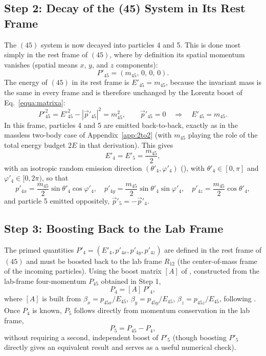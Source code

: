 \documentclass{article}
\begin{document}
\subsection{Step 2: Decay of the (45) System in Its Rest Frame}
The $(45)$ system is now decayed into particles 4 and 5. This is done most simply in the rest frame of $(45)$, where by definition its spatial momentum vanishes (spatial means $x$, $y$, and $z$ components):
\begin{equation}
    P'_{45} = (m_{45},\, 0,\, 0,\, 0).
\end{equation}
The energy of $(45)$ in its rest frame is $E'_{45}=m_{45}$, because the invariant mass is the same in every frame and is therefore unchanged by the Lorentz boost of Eq.~\ref{equa:matrixa}:
\begin{equation}
    P'^2_{45} = E'^2_{45} - |\vec{p}'_{45}|^2 = m_{45}^2, \qquad \vec{p}'_{45} = 0 \quad \Rightarrow \quad E'_{45} = m_{45}.
\end{equation}
In this frame, particles 4 and 5 are emitted back-to-back, exactly as in the massless two-body case of Appendix~\ref{app:2to2} (with $m_{45}$ playing the role of the total energy budget $2E$ in that derivation). This gives
\begin{equation}
    E'_4 = E'_5 = \frac{m_{45}}{2},
\end{equation}
with an isotropic random emission direction $(\theta'_4, \varphi'_4)$ (), with $\theta'_4 \in [0,\pi]$ and $\varphi'_4 \in [0, 2\pi)$, so that
\begin{equation}
    p'_{4x} = \frac{m_{45}}{2}\sin\theta'_4\cos\varphi'_4, \quad p'_{4y} = \frac{m_{45}}{2}\sin\theta'_4\sin\varphi'_4, \quad p'_{4z} = \frac{m_{45}}{2}\cos\theta'_4,
\end{equation}
and particle 5 emitted oppositely, $\vec{p}'_5 = -\vec{p}'_4$.

\subsection{Step 3: Boosting Back to the Lab Frame}
The primed quantities $P'_4 = (E'_4, p'_{4x}, p'_{4y}, p'_{4z})$ are defined in the rest frame of $(45)$ and must be boosted back to the lab frame $R_{12}$ (the center-of-mass frame of the incoming particles). Using the boost matrix $[A]$ of , constructed from the lab-frame four-momentum $P_{45}$ obtained in Step 1,
\begin{equation}
    P_4 = [A]\, P'_4, \label{equa:matrixa}
\end{equation}
where $[A]$ is built from $\beta_x = p_{45x}/E_{45}$, $\beta_y = p_{45y}/E_{45}$, $\beta_z = p_{45z}/E_{45}$, following . Once $P_4$ is known, $P_5$ follows directly from momentum conservation in the lab frame,
\begin{equation}
    P_5 = P_{45} - P_4,
\end{equation}
without requiring a second, independent boost of $P'_5$ (though boosting $P'_5$ directly gives an equivalent result and serves as a useful numerical check).
\end{document}
